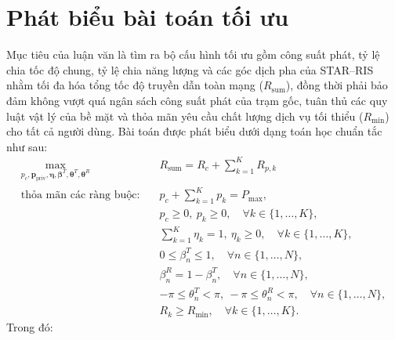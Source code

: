 \section{Phát biểu bài toán tối ưu}
\label{sec:phat-bieu}

Mục tiêu của luận văn là tìm ra bộ cấu hình tối ưu gồm công suất phát, tỷ lệ chia tốc độ chung, tỷ lệ chia
năng lượng và các góc dịch pha của STAR--RIS nhằm tối đa hóa tổng tốc độ truyền dẫn toàn mạng
($R_{\mathrm{sum}}$), đồng thời phải bảo đảm không vượt quá ngân sách công suất phát của trạm gốc, tuân thủ
các quy luật vật lý của bề mặt và thỏa mãn yêu cầu chất lượng dịch vụ tối thiểu ($R_{\min}$) cho tất cả người
dùng. Bài toán được phát biểu dưới dạng toán học chuẩn tắc như sau:
\begin{subequations}
\label{eq:bai-toan}
\begin{align}
\max_{p_c, \mathbf{p}_{\mathrm{priv}}, \boldsymbol{\eta}, \boldsymbol{\beta}^T, \boldsymbol{\theta}^T,
\boldsymbol{\theta}^R} \quad & R_{\mathrm{sum}} = R_c + \sum_{k=1}^{K} R_{p,k} \label{eq:bt-muc-tieu}\\
\text{thỏa mãn các ràng buộc:}\quad & p_c + \sum_{k=1}^{K} p_k = P_{\max}, \label{eq:bt-cong-suat}\\
& p_c \ge 0,\ p_k \ge 0, \quad \forall k \in \{1, \dots, K\}, \label{eq:bt-khong-am}\\
& \sum_{k=1}^{K} \eta_k = 1,\ \eta_k \ge 0, \quad \forall k \in \{1, \dots, K\}, \label{eq:bt-eta}\\
& 0 \le \beta^T_n \le 1, \quad \forall n \in \{1, \dots, N\}, \label{eq:bt-beta}\\
& \beta^R_n = 1 - \beta^T_n, \quad \forall n \in \{1, \dots, N\}, \label{eq:bt-beta-r}\\
& -\pi \le \theta^T_n < \pi,\ -\pi \le \theta^R_n < \pi, \quad \forall n \in \{1, \dots, N\}, \label{eq:bt-pha}\\
& R_k \ge R_{\min}, \quad \forall k \in \{1, \dots, K\}. \label{eq:bt-qos}
\end{align}
\end{subequations}
Trong đó:
